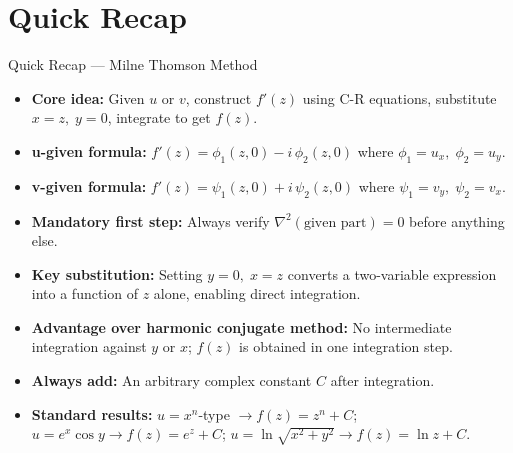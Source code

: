 \documentclass[12pt,a4paper]{article}
\begin{document}
\section{Quick Recap}

\begin{learnbox}{Quick Recap --- Milne Thomson Method}
\begin{itemize}
  \item \textbf{Core idea:} Given \( u \) or \( v \), construct \( f'(z) \) using C-R equations, substitute \( x=z,\;y=0 \), integrate to get \( f(z) \).
  \item \textbf{u-given formula:} \( f'(z) = \phi_1(z,0) - i\,\phi_2(z,0) \) where \( \phi_1 = u_x,\;\phi_2 = u_y \).
  \item \textbf{v-given formula:} \( f'(z) = \psi_1(z,0) + i\,\psi_2(z,0) \) where \( \psi_1 = v_y,\;\psi_2 = v_x \).
  \item \textbf{Mandatory first step:} Always verify \( \nabla^2(\text{given part}) = 0 \) before anything else.
  \item \textbf{Key substitution:} Setting \( y=0,\;x=z \) converts a two-variable expression into a function of \( z \) alone, enabling direct integration.
  \item \textbf{Advantage over harmonic conjugate method:} No intermediate integration against \( y \) or \( x \); \( f(z) \) is obtained in one integration step.
  \item \textbf{Always add:} An arbitrary complex constant \( C \) after integration.
  \item \textbf{Standard results:} \( u = x^n \)-type \( \to f(z)=z^n+C \); \( u=e^x\cos y \to f(z)=e^z+C \); \( u=\ln\sqrt{x^2+y^2} \to f(z)=\ln z + C \).
\end{itemize}
\end{learnbox}
\end{document}
